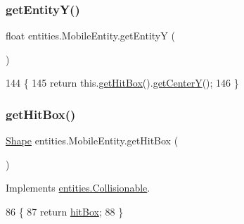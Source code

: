 \subsubsection{\texorpdfstring{get\+Entity\+Y()}{getEntityY()}}
{\footnotesize\ttfamily float entities.\+Mobile\+Entity.\+get\+EntityY (\begin{DoxyParamCaption}{ }\end{DoxyParamCaption})\hspace{0.3cm}{\ttfamily [inline]}}


\begin{DoxyCode}
144                              \{
145         \textcolor{keywordflow}{return} this.\mbox{\hyperlink{classentities_1_1_mobile_entity_a7192f025dc20283c5eee9efb9d5b4b6f}{getHitBox}}().\mbox{\hyperlink{classorg_1_1newdawn_1_1slick_1_1geom_1_1_shape_a9937c71e414375a9974c7a5d8fcc06e5}{getCenterY}}();
146     \}
\end{DoxyCode}
\mbox{\label{classentities_1_1_mobile_entity_a7192f025dc20283c5eee9efb9d5b4b6f}} 
\subsubsection{\texorpdfstring{get\+Hit\+Box()}{getHitBox()}}
{\footnotesize\ttfamily \mbox{\hyperlink{classorg_1_1newdawn_1_1slick_1_1geom_1_1_shape}{Shape}} entities.\+Mobile\+Entity.\+get\+Hit\+Box (\begin{DoxyParamCaption}{ }\end{DoxyParamCaption})\hspace{0.3cm}{\ttfamily [inline]}}



Implements \mbox{\hyperlink{interfaceentities_1_1_collisionable_a850ae5aa594d7b0d29ccef98436b8e77}{entities.\+Collisionable}}.


\begin{DoxyCode}
86                              \{
87         \textcolor{keywordflow}{return} \mbox{\hyperlink{classentities_1_1_mobile_entity_a996d583dcbf4fd5609e14ec87dbfa7a6}{hitBox}};
88     \}
\end{DoxyCode}
\mbox{\label{classentities_1_1_mobile_entity_a21020e5f09194aae693dbce8d7d59ffa}} 
